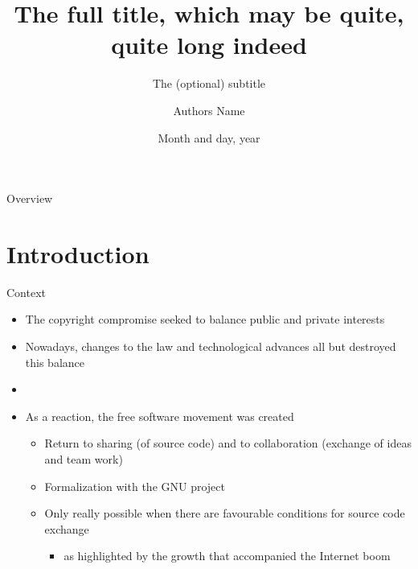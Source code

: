 \documentclass[
  xcolor={hyperref,svgnames,x11names,table},
  hyperref={pdfencoding=unicode,plainpages=false,pdfpagelabels=true,breaklinks=true},
  brazilian,english,12pt,aspectratio=149,
]{beamer}
\title[The shortened title]{The full title, which may be quite,\\ quite long indeed}
\subtitle{The (optional) subtitle}
\author[Authors Name]{Authors Name}
\institute[USP]{\textbf{Workshop Name} \\ Computer Science Department \\ IME USP}
\date{Month and day, year}
\begin{document}
\customtitlepage

\showqrcode

\begin{frame}{Overview}
  \overview
\end{frame}

\section{Introduction}

\begin{frame}{Context}
  \begin{itemize}
    \item The copyright compromise seeked to balance public and private interests
    \item Nowadays, changes to the law and technological advances all but destroyed this balance
    \item[]\strut %
    \item As a reaction, the free software movement was created
    \begin{itemize}
      \item Return to sharing (of source code) and to collaboration (exchange of ideas and team work)
      \item Formalization with the GNU project
      \item Only really possible when there are favourable conditions for source code exchange
      \begin{itemize}
        \item as highlighted by the growth that accompanied the Internet boom
      \end{itemize}
    \end{itemize}
  \end{itemize}

\end{frame}
\end{document}
